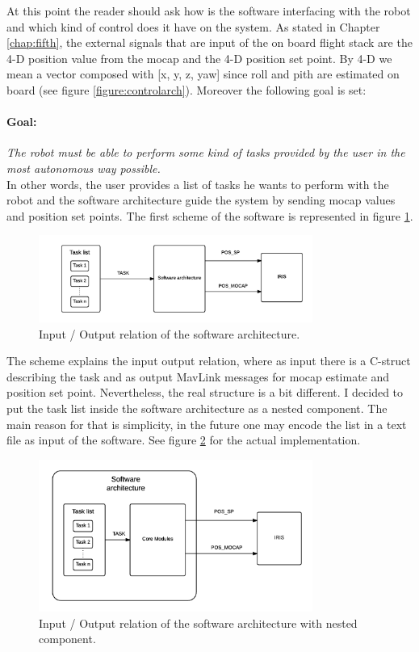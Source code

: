 At this point the reader should ask how is the software interfacing with the robot and which kind of control does it have on the system. As stated in Chapter \ref{chap:fifth}, the external signals that are input of the on board flight stack are the 4-D position value from the mocap and the 4-D position set point. By 4-D we mean a vector composed with [x, y, z, yaw] since roll and pith are estimated on board (see figure \ref{figure:controlarch}). Moreover the following goal is set:
\paragraph{Goal:} \textit{The robot must be able to perform some kind of tasks provided by the user in the most autonomous way possible.} \\

\noindent
In other words, the user provides a list of tasks he wants to perform with the robot and the software architecture guide the system by sending mocap values and position set points. The first scheme of the software is represented in figure \ref{figure:inout}. 
\begin{figure}[h]
\centering
 \includegraphics[width=0.8\textwidth]{first_arch.png}
 \caption[In-out relation]{Input / Output relation of the software architecture.}
 \label{figure:inout}
\end{figure}
The scheme explains the input output relation, where as input there is a C-struct describing the task and as output MavLink messages for mocap estimate and position set point. Nevertheless, the real structure is a bit different. I decided to put the task list inside the software architecture as a nested component. The main reason for that is simplicity, in the future one may encode the list in a text file as input of the software. See figure \ref{figure:inoutnest} for the actual implementation.

\begin{figure}[h]
\centering
 \includegraphics[width=0.8\textwidth]{nested_arch.png}
 \caption[In-out relation for the nested arch]{Input / Output relation of the software architecture with nested component.}
 \label{figure:inoutnest}
\end{figure}

